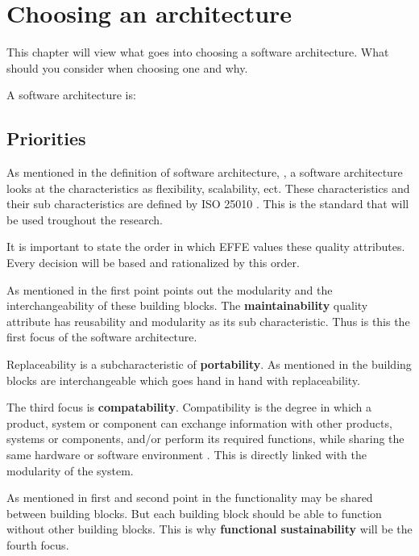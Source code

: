 \chapter{Choosing an architecture}
\label{sec:ChoosingArchitecture}

This chapter will view what goes into choosing a software architecture. What should you consider when choosing one and why.

A software architecture is:


\section{Priorities}
\label{sec:Priorities}

As mentioned in the definition of software architecture, , a software architecture looks at the characteristics as flexibility, scalability, ect. These characteristics and their sub characteristics are defined by ISO 25010 \cite{iso25010}. This is the standard that will be used troughout the research.

It is important to state the order in which EFFE values these quality attributes. Every decision will be based and rationalized by this order.

As mentioned in  the first point points out the modularity and the interchangeability of these building blocks. The \textbf{maintainability} quality attribute has reusability and modularity as its sub characteristic. Thus is this the first focus of the software architecture.

Replaceability is a subcharacteristic of \textbf{portability}. As mentioned in  the building blocks are interchangeable which goes hand in hand with replaceability.

The third focus is \textbf{compatability}. Compatibility is the degree in which a product, system or component can exchange information with other products, systems or components, and/or perform its required functions, while sharing the same hardware or software environment \cite{iso25010}. This is directly linked with the modularity of the system.

As mentioned in first and second point in  the functionality may be shared between building blocks. But each building block should be able to function without other building blocks. This is why \textbf{functional sustainability} will be the fourth focus.


